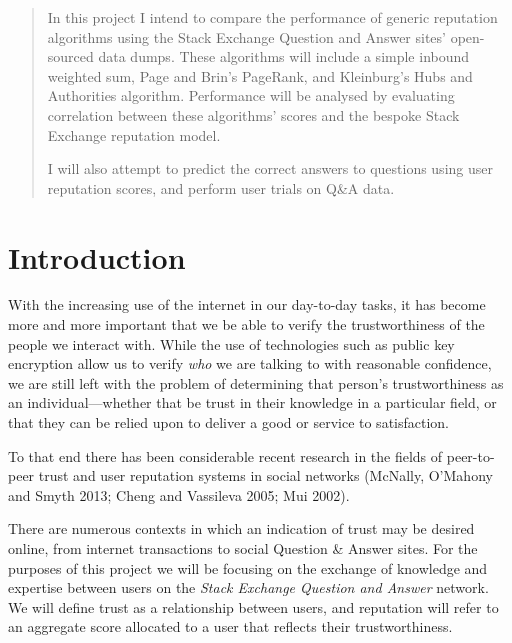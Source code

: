 \documentclass[]{final_report}
\begin{document}
\begin{abstract}

In this project I intend to compare the performance of generic reputation algorithms using the Stack Exchange Question and Answer sites' open-sourced data dumps. These algorithms will include a simple inbound weighted sum, Page and Brin's PageRank, and Kleinburg's Hubs and Authorities algorithm. Performance will be analysed by evaluating correlation between these algorithms' scores and the bespoke Stack Exchange reputation model.

I will also attempt to predict the correct answers to questions using user reputation scores, and perform user trials on Q\&A data.

\end{abstract}
\newpage



\chapter{Introduction}

With the increasing use of the internet in our day-to-day tasks, it has become more and more important that we be able to verify the trustworthiness of the people we interact with. While the use of technologies such as public key encryption allow us to verify \textsl{who} we are talking to with reasonable confidence, we are still left with the problem of determining that person's trustworthiness as an individual---whether that be trust in their knowledge in a particular field, or that they can be relied upon to deliver a good or service to satisfaction.

To that end there has been considerable recent research in the fields of peer-to-peer trust and user reputation systems in social networks (McNally, O'Mahony and Smyth 2013; Cheng and Vassileva 2005; Mui 2002).

There are numerous contexts in which an indication of trust may be desired online, from internet transactions to social Question \& Answer sites. For the purposes of this project we will be focusing on the exchange of knowledge and expertise between users on the \textsl{Stack Exchange Question and Answer} network. We will define trust as a relationship between users, and reputation will refer to an aggregate score allocated to a user that reflects their trustworthiness.
\end{document}
